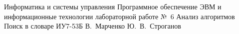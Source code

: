 \makereporttitle
    {Информатика и системы управления}
    {Программное обеспечение ЭВМ и информационные технологии}
    {лабораторной работе №~6}
    {Анализ алгоритмов}
    {Поиск в словаре}
    {}
    {ИУ7-53Б}
    {В.~Марченко}
    {Ю.~В.~Строганов}
    {}
